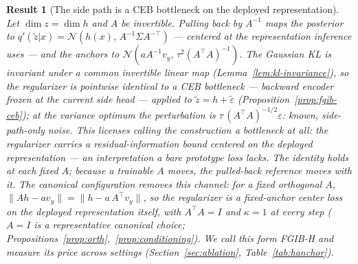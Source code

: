 \documentclass{article} %
\newtheorem{result}{Result}   %
\newcommand{\Ncal}{\mathcal{N}}
\begin{document}
\begin{result}[The side path is a CEB bottleneck on the deployed representation]
\label{res:equiv}
Let $\dim z = \dim h$ and $A$ be invertible. Pulling back by $A^{-1}$ maps the
posterior to $q'(\tilde z|x) = \Ncal(h(x),\,A^{-1}\Sigma A^{-\top})$ --- centered at the
representation inference uses --- and the anchors to
$\Ncal(a A^{-1}v_y,\, \tau^2 (A^{\top}A)^{-1})$. The Gaussian KL is invariant under a
common invertible linear map (Lemma~\ref{lem:kl-invariance}), so the regularizer is
pointwise identical to a CEB bottleneck --- backward encoder frozen at the current side
head --- applied to $\tilde z = h + \tilde\varepsilon$ (Proposition~\ref{prop:fgib-ceb});
at the variance optimum the perturbation is $\tau\,(A^{\top}A)^{-1/2}\varepsilon$:
\emph{known, side-path-only} noise. This licenses calling the construction a bottleneck
at all: the regularizer carries a residual-information bound centered on the deployed
representation --- an interpretation a bare prototype loss lacks. The identity holds
at each fixed $A$; because a trainable $A$ moves, the pulled-back reference moves with
it. The \emph{canonical} configuration removes this channel: for a fixed orthogonal $A$,
$\|A h - a v_y\| = \|h - a\,A^{\top}v_y\|$, so the regularizer is a fixed-anchor center
loss on the deployed representation itself, with $A^{\top}A = I$ and $\kappa = 1$ at
every step ($A = I$ is a representative canonical choice;
Propositions~\ref{prop:orth},~\ref{prop:conditioning}). We call this form
\emph{FGIB-H} and measure its price across settings
(Section~\ref{sec:ablation}, Table~\ref{tab:hanchor}).
\label{res:orth}
\end{result}
\end{document}
